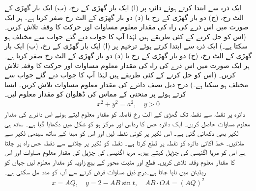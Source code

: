 
ایک ذرہ  سے ابتدا کرتے ہوئے دائرہ   پر (ا) ایک بار گھڑی کے رخ، (ب) ایک بار گھڑی کے الٹ رخ، (ج) دو بار گھڑی کے رخ یا (د) دو بار گھڑی کے الٹ رخ صفر کرتا ہے۔ ہر ایک صورت میں اس ذرے کی راہ کی مقدار معلوم مساوات اور حرکت کا وقفہ تلاش کریں۔ (اس کو حل کرنے کے کئی طریقے ہیں لہٰذا آپ کا  جواب دیے گئے جواب سے مختلف ہو سکتا ہے۔)
ایک ذرہ  سے ابتدا کرتے ہوئے ترخیم   پر  (ا) ایک بار گھڑی کے رخ، (ب) ایک بار گھڑی کے الٹ رخ، (ج) دو بار گھڑی کے رخ یا (د) دو بار گھڑی کے الٹ رخ صفر کرتا ہے۔ ہر ایک صورت میں اس ذرے کی راہ کی مقدار معلوم مساوات اور حرکت کا وقفہ تلاش کریں۔ (اس کو حل کرنے کے کئی طریقے ہیں لہٰذا آپ کا  جواب دیے گئے جواب سے مختلف ہو سکتا ہے۔)
درج ذیل نصف دائرے کی مقدار معلوم مساوات تلاش کریں۔ ایسا کرتے  ہوئے  پر منحنی کے مماس کی ڈھلوان  کو مقدار معلوم لیں۔
\begin{align*}
x^2+y^2=a^2,\quad y>0
\end{align*}
دائرہ  پر نقطہ  سے نقطہ  تک گھڑی کے الٹ رخ  فاصلہ  کو مقدار معلوم لیتے ہوئے  اس دائرے کی مقدار معلوم مساوات حاصل کریں۔
ایک دائرہ جس کا رداس  اور مرکز  ہو کو شکل  میں دکھایا گیا ہے۔ ساتھ ہی لکیر  بھی دکھائی گئی ہے۔ اس لکیر پر کوئی نقطہ  لیں اور اس کو مبدا  کے ساتھ سیدھی لکیر سے ملائیں۔ خط  اکائی دائرہ کو نقطہ  پر قطع کرتا ہے۔ نقطہ  کو لکیر  پر چلانے سے نقطہ  جس راہ پر چلتا ہے اس کو مریا اگنیسی کی چڑیل کہتے ہیں۔ مریا اگنیسی کی چڑیل کی مقدار معلوم مساوات اور اس کا مقدار معلوم وقفہ تلاش کریں۔ قطع  اور مثبت  محور کے بیچ زاویہ  کو مقدار معلوم لیں جہاں  کو ریڈیئن میں ناپا جاتا ہے۔درج ذیل مساوات فرض کرنے سے آپ کو مدد مل سکتی ہے۔
\begin{align*}
x=AQ,\quad y=2-AB\sin t,\quad AB\cdot OA=(AQ)^2
\end{align*}
